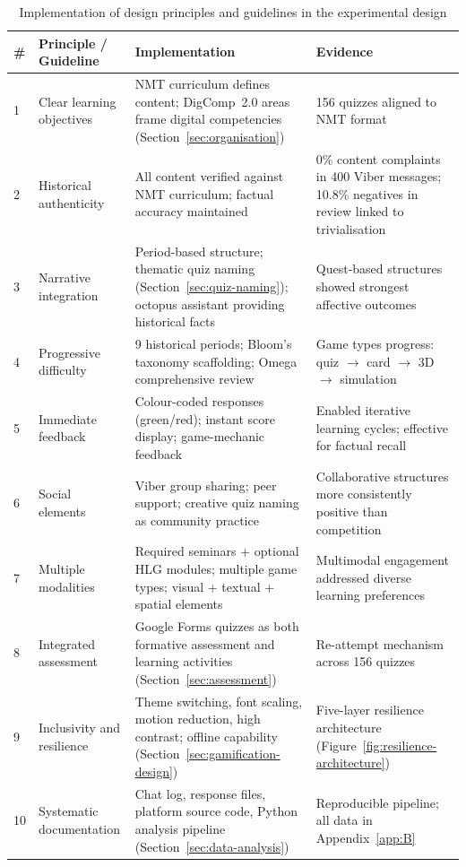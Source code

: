 \begin{table}[!h]
\centering
\caption{Implementation of design principles and guidelines in the experimental design}
\label{tab:principle-alignment}
\small
\begin{tabular}{p{0.5cm}p{3.2cm}p{4.5cm}p{4cm}}
\hline
\textbf{\#} & \textbf{Principle / Guideline} & \textbf{Implementation} & \textbf{Evidence} \\
\hline
1 & Clear learning objectives & NMT curriculum defines content; DigComp~2.0 areas frame digital competencies (Section~\ref{sec:organisation}) & 156 quizzes aligned to NMT format \\
\hline
2 & Historical authenticity~\cite{KorniienkoSemerikov2024} & All content verified against NMT curriculum; factual accuracy maintained & 0\% content complaints in 400 Viber messages; 10.8\% negatives in review linked to trivialisation~\cite{Prieto-Andreu2024244} \\
\hline
3 & Narrative integration~\cite{Sailer2017} & Period-based structure; thematic quiz naming (Section~\ref{sec:quiz-naming}); octopus assistant providing historical facts & Quest-based structures showed strongest affective outcomes~\cite{KorniienkoSemerikov2024} \\
\hline
4 & Progressive difficulty~\cite{Clark2016} & 9 historical periods; Bloom's taxonomy scaffolding; Omega comprehensive review & Game types progress: quiz $\to$ card $\to$ 3D $\to$ simulation~\cite{PrietoAndreu202073} \\
\hline
5 & Immediate feedback~\cite{Hattie2009} & Colour-coded responses (green/red); instant score display; game-mechanic feedback & Enabled iterative learning cycles; effective for factual recall~\cite{Zhonggen2019} \\
\hline
6 & Social elements~\cite{Qian2016} & Viber group sharing; peer support; creative quiz naming as community practice & Collaborative structures more consistently positive than competition~\cite{Hamari2014} \\
\hline
7 & Multiple modalities~\cite{Tamim2011} & Required seminars + optional HLG modules; multiple game types; visual + textual + spatial elements & Multimodal engagement addressed diverse learning preferences~\cite{Connolly2012} \\
\hline
8 & Integrated assessment & Google Forms quizzes as both formative assessment and learning activities (Section~\ref{sec:assessment}) & Re-attempt mechanism across 156 quizzes \\
\hline
9 & Inclusivity and resilience & Theme switching, font scaling, motion reduction, high contrast; offline capability (Section~\ref{sec:gamification-design}) & Five-layer resilience architecture (Figure~\ref{fig:resilience-architecture}) \\
\hline
10 & Systematic documentation & Chat log, response files, platform source code, Python analysis pipeline (Section~\ref{sec:data-analysis}) & Reproducible pipeline; all data in Appendix~\ref{app:B} \\
\hline
\end{tabular}
\end{table}

